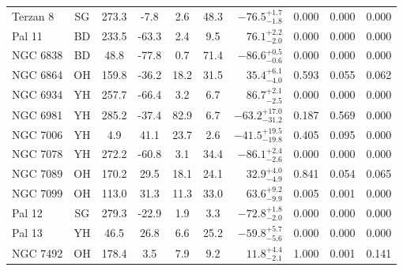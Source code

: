 \begin{tabular}{lcccccrccc}
	Terzan 8 & SG & 273.3 & -7.8 & 2.6 & 48.3 & $-76.5^{+1.7}_{-1.8}$ & 0.000 & 0.000 & 0.000 \\
	Pal 11 & BD & 233.5 & -63.3 & 2.4 & 9.5 & $76.1^{+2.2}_{-2.0}$ & 0.000 & 0.000 & 0.000 \\
	NGC 6838 & BD & 48.8 & -77.8 & 0.7 & 71.4 & $-86.6^{+0.5}_{-0.6}$ & 0.000 & 0.000 & 0.000 \\
	NGC 6864 & OH & 159.8 & -36.2 & 18.2 & 31.5 & $35.4^{+6.1}_{-4.0}$ & 0.593 & 0.055 & 0.062 \\
	NGC 6934 & YH & 257.7 & -66.4 & 3.2 & 6.7 & $86.7^{+2.1}_{-2.5}$ & 0.000 & 0.000 & 0.000 \\
	NGC 6981 & YH & 285.2 & -37.4 & 82.9 & 6.7 & $-63.2^{+17.0}_{-31.2}$ & 0.187 & 0.569 & 0.000 \\
	NGC 7006 & YH & 4.9 & 41.1 & 23.7 & 2.6 & $-41.5^{+19.5}_{-19.8}$ & 0.405 & 0.095 & 0.000 \\
	NGC 7078 & YH & 272.2 & -60.8 & 3.1 & 34.4 & $-86.1^{+2.4}_{-2.6}$ & 0.000 & 0.000 & 0.000 \\
	NGC 7089 & OH & 170.2 & 29.5 & 18.1 & 24.1 & $32.9^{+4.0}_{-4.9}$ & 0.841 & 0.054 & 0.065 \\
	NGC 7099 & OH & 113.0 & 31.3 & 11.3 & 33.0 & $63.6^{+9.2}_{-9.9}$ & 0.005 & 0.001 & 0.000 \\
	Pal 12 & SG & 279.3 & -22.9 & 1.9 & 3.3 & $-72.8^{+1.8}_{-2.0}$ & 0.000 & 0.000 & 0.000 \\
	Pal 13 & YH & 46.5 & 26.8 & 6.6 & 25.2 & $-59.8^{+5.7}_{-5.6}$ & 0.000 & 0.000 & 0.000 \\
	NGC 7492 & OH & 178.4 & 3.5 & 7.9 & 9.2 & $11.8^{+4.4}_{-2.1}$ & 1.000 & 0.001 & 0.141 \\
	\bottomrule
\end{tabular}
\endgroup